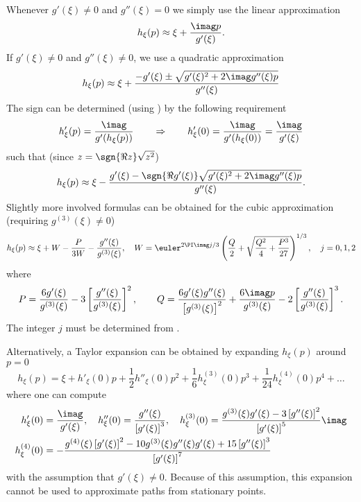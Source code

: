 Whenever $g'(\xi)\not=0$ and $g''(\xi)=0$ we simply use the linear approximation
\begin{equation*}
	h_\xi(p) \approx \xi + \frac{\imag p}{g'(\xi)}.
\end{equation*}
If $g'(\xi)\not=0$ and $g''(\xi)\neq 0$, we use a quadratic approximation
\begin{equation*}
	h_\xi(p) \approx \xi + \frac{-g'(\xi)\pm \sqrt{g'(\xi)^2+2\imag g''(\xi)p}}{g''(\xi)}
\end{equation*}
The sign can be determined (using ) by the following requirement
\begin{equation}\label{Eq4:condh_xi}
	h_\xi'(p) = \frac{\imag}{g'(h_\xi(p))}\qquad \Rightarrow\qquad h_\xi'(0)= \frac{\imag}{g'(h_\xi(0))}= \frac{\imag}{g'(\xi)}
\end{equation}
such that (since $z=\sgn{\Re{z}}\sqrt{z^2}$)
\begin{equation*}
	h_\xi(p) \approx \xi - \frac{g'(\xi)-\sgn{\Re{g'(\xi)}}\sqrt{g'(\xi)^2+2\imag g''(\xi)p}}{g''(\xi)}.
\end{equation*}
Slightly more involved formulas can be obtained for the cubic approximation (requiring $g^{(3)}(\xi)\neq 0$)
\begin{equation*}
	h_\xi(p) \approx \xi + W -\frac{P}{3W}-\frac{g''(\xi)}{g^{(3)}(\xi)},\quad W = \euler^{2\PI\imag j/3}\left(\frac{Q}{2}+\sqrt{\frac{Q^2}{4}+\frac{P^3}{27}}\right)^{1/3},\quad j=0,1,2
\end{equation*}
where
\begin{equation*}
	P = \frac{6g'(\xi)}{g^{(3)}(\xi)} - 3\left[\frac{g''(\xi)}{g^{(3)}(\xi)}\right]^2,\qquad Q = \frac{6g'(\xi)g''(\xi)}{\left[g^{(3)}(\xi)\right]^2}+\frac{6\imag p}{g^{(3)}(\xi)} - 2\left[\frac{g''(\xi)}{g^{(3)}(\xi)}\right]^3.
\end{equation*}
The integer $j$ must be determined from . 

Alternatively, a Taylor expansion can be obtained by expanding $h_\xi(p)$ around $p=0$
\begin{equation*}
	h_\xi(p) = \xi + h'_\xi(0)p + \frac12h''_\xi(0)p^2 + \frac{1}{6}h^{(3)}_\xi(0)p^3 + \frac{1}{24}h^{(4)}_\xi(0)p^4+\dots
\end{equation*}
where one can compute 
\begin{align*}
	h'_\xi(0) &= \frac{\imag}{g'(\xi)},\quad h''_\xi(0) = \frac{g''(\xi)}{\left[g'(\xi)\right]^3},\quad h^{(3)}_\xi(0) = \frac{g^{(3)}(\xi)g'(\xi)-3\left[g''(\xi)\right]^2}{\left[g'(\xi)\right]^5}\imag\\
	h^{(4)}_\xi(0) &= -\frac{g^{(4)}(\xi)\left[g'(\xi)\right]^2-10g^{(3)}(\xi)g''(\xi)g'(\xi)+15\left[g''(\xi)\right]^3}{\left[g'(\xi)\right]^7}                                                                                                                                                                                                                                                                                         
\end{align*}
with the assumption that $g'(\xi)\not=0$. Because of this assumption, this expansion cannot be used to approximate paths from stationary points.

